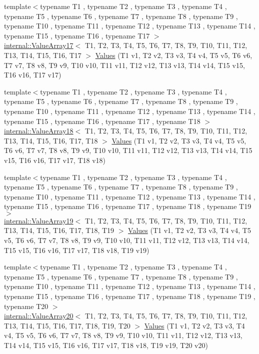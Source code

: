 \begin{DoxyCompactItemize}
\item 
{\footnotesize template$<$typename T1 , typename T2 , typename T3 , typename T4 , typename T5 , typename T6 , typename T7 , typename T8 , typename T9 , typename T10 , typename T11 , typename T12 , typename T13 , typename T14 , typename T15 , typename T16 , typename T17 $>$ }\\\mbox{\hyperlink{classtesting_1_1internal_1_1_value_array17}{internal\+::\+Value\+Array17}}$<$ T1, T2, T3, T4, T5, T6, T7, T8, T9, T10, T11, T12, T13, T14, T15, T16, T17 $>$ \mbox{\hyperlink{namespacetesting_a5cb89ee5c491cbe65de523f9f1bc1987}{Values}} (T1 v1, T2 v2, T3 v3, T4 v4, T5 v5, T6 v6, T7 v7, T8 v8, T9 v9, T10 v10, T11 v11, T12 v12, T13 v13, T14 v14, T15 v15, T16 v16, T17 v17)
\item 
{\footnotesize template$<$typename T1 , typename T2 , typename T3 , typename T4 , typename T5 , typename T6 , typename T7 , typename T8 , typename T9 , typename T10 , typename T11 , typename T12 , typename T13 , typename T14 , typename T15 , typename T16 , typename T17 , typename T18 $>$ }\\\mbox{\hyperlink{classtesting_1_1internal_1_1_value_array18}{internal\+::\+Value\+Array18}}$<$ T1, T2, T3, T4, T5, T6, T7, T8, T9, T10, T11, T12, T13, T14, T15, T16, T17, T18 $>$ \mbox{\hyperlink{namespacetesting_ab442a00c98b4bfb3bfa81f5e06bf53f9}{Values}} (T1 v1, T2 v2, T3 v3, T4 v4, T5 v5, T6 v6, T7 v7, T8 v8, T9 v9, T10 v10, T11 v11, T12 v12, T13 v13, T14 v14, T15 v15, T16 v16, T17 v17, T18 v18)
\item 
{\footnotesize template$<$typename T1 , typename T2 , typename T3 , typename T4 , typename T5 , typename T6 , typename T7 , typename T8 , typename T9 , typename T10 , typename T11 , typename T12 , typename T13 , typename T14 , typename T15 , typename T16 , typename T17 , typename T18 , typename T19 $>$ }\\\mbox{\hyperlink{classtesting_1_1internal_1_1_value_array19}{internal\+::\+Value\+Array19}}$<$ T1, T2, T3, T4, T5, T6, T7, T8, T9, T10, T11, T12, T13, T14, T15, T16, T17, T18, T19 $>$ \mbox{\hyperlink{namespacetesting_a673757dbfc048bbb48e459485b30b2bf}{Values}} (T1 v1, T2 v2, T3 v3, T4 v4, T5 v5, T6 v6, T7 v7, T8 v8, T9 v9, T10 v10, T11 v11, T12 v12, T13 v13, T14 v14, T15 v15, T16 v16, T17 v17, T18 v18, T19 v19)
\item 
{\footnotesize template$<$typename T1 , typename T2 , typename T3 , typename T4 , typename T5 , typename T6 , typename T7 , typename T8 , typename T9 , typename T10 , typename T11 , typename T12 , typename T13 , typename T14 , typename T15 , typename T16 , typename T17 , typename T18 , typename T19 , typename T20 $>$ }\\\mbox{\hyperlink{classtesting_1_1internal_1_1_value_array20}{internal\+::\+Value\+Array20}}$<$ T1, T2, T3, T4, T5, T6, T7, T8, T9, T10, T11, T12, T13, T14, T15, T16, T17, T18, T19, T20 $>$ \mbox{\hyperlink{namespacetesting_aedd2f90dfb3c42dce713ba0b89cde96c}{Values}} (T1 v1, T2 v2, T3 v3, T4 v4, T5 v5, T6 v6, T7 v7, T8 v8, T9 v9, T10 v10, T11 v11, T12 v12, T13 v13, T14 v14, T15 v15, T16 v16, T17 v17, T18 v18, T19 v19, T20 v20)

\end{DoxyCompactItemize}
